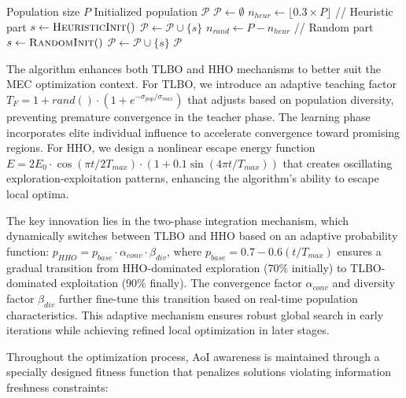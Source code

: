 \documentclass[conference]{IEEEtran}
\begin{document}
\begin{algorithm}[!t]
  \small
  \caption{Intelligent Initialization Strategy}
  \label{alg:init}
  \begin{algorithmic}[1]
    \REQUIRE Population size $P$
    \ENSURE Initialized population $\mathcal{P}$
    \STATE $\mathcal{P} \leftarrow \emptyset$
    \STATE $n_{heur} \leftarrow \lfloor 0.3 \times P \rfloor$ // Heuristic part
        \STATE $s \leftarrow \textsc{HeuristicInit}()$
        \STATE $\mathcal{P} \leftarrow \mathcal{P} \cup \{s\}$
    \ENDFOR
    \STATE $n_{rand} \leftarrow P - n_{heur}$ // Random part
        \STATE $s \leftarrow \textsc{RandomInit}()$
        \STATE $\mathcal{P} \leftarrow \mathcal{P} \cup \{s\}$
    \ENDFOR
    \RETURN $\mathcal{P}$
  \end{algorithmic}
\end{algorithm}

The algorithm enhances both TLBO and HHO mechanisms to better suit the MEC optimization context. For TLBO, we introduce an adaptive teaching factor $T_F = 1 + rand() \cdot (1 + e^{-\sigma_{pop}/\sigma_{max}})$ that adjusts based on population diversity, preventing premature convergence in the teacher phase. The learning phase incorporates elite individual influence to accelerate convergence toward promising regions. For HHO, we design a nonlinear escape energy function $E = 2E_0 \cdot \cos(\pi t/2T_{max}) \cdot (1 + 0.1 \sin(4\pi t/T_{max}))$ that creates oscillating exploration-exploitation patterns, enhancing the algorithm's ability to escape local optima.

The key innovation lies in the two-phase integration mechanism, which dynamically switches between TLBO and HHO based on an adaptive probability function: $p_{HHO} = p_{base} \cdot \alpha_{conv} \cdot \beta_{div}$, where $p_{base} = 0.7 - 0.6(t/T_{max})$ ensures a gradual transition from HHO-dominated exploration (70\% initially) to TLBO-dominated exploitation (90\% finally). The convergence factor $\alpha_{conv}$ and diversity factor $\beta_{div}$ further fine-tune this transition based on real-time population characteristics. This adaptive mechanism ensures robust global search in early iterations while achieving refined local optimization in later stages.

Throughout the optimization process, AoI awareness is maintained through a specially designed fitness function that penalizes solutions violating information freshness constraints:
\end{document}

